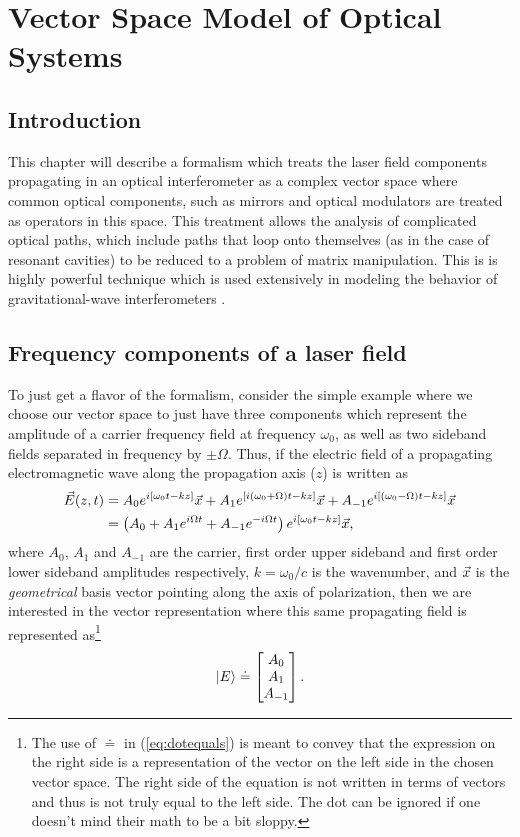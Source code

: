 

\chapter{Vector Space Model of Optical Systems}

\section{Introduction}
This chapter will describe a formalism which treats the laser field components propagating in an optical interferometer as a complex vector space where common optical components, such as mirrors and optical modulators are treated as operators in this space. %
This treatment allows the analysis of complicated optical paths, which include paths that loop onto themselves (as in the case of resonant cavities) to be reduced to a problem of matrix manipulation. %
This is is highly powerful technique which is used extensively in modeling the behavior of gravitational-wave interferometers \cite{Vinet1986,Hefetz:97,Sigg:00}.

\section{Frequency components of a laser field}
To just get a flavor of the formalism, consider the simple example where we choose our vector space to just have three components which represent the amplitude of a carrier frequency field at frequency $\omega_0$, as well as two sideband fields separated in frequency by $\pm\Omega$. %
Thus, if the electric field of a propagating electromagnetic wave along the propagation axis ($z$) is written as
\begin{align*}
\vec{E}(z,t) &= A_0 e^{i[\omega_0t -kz]}\vec{x} + A_1e^{[i(\omega_0+\Omega)t -kz]}\vec{x} + A_{-1}e^{i[(\omega_0-\Omega)t -kz]}\vec{x}\\
&= \left( A_0 + A_1 e^{i\Omega t}+A_{-1}e^{-i\Omega t}\right) e^{i[\omega_0 t-kz]}\vec{x},
\end{align*}
where $A_0$, $A_1$ and $A_{-1}$ are the carrier, first order upper sideband and first order lower sideband amplitudes respectively, $k=\omega_0/c$ is the wavenumber, and $\vec{x}$ is the \emph{geometrical} basis vector pointing along the axis of polarization, then we are interested in the vector representation where this same propagating field is represented as\footnote{The use of $\doteq$ in (\ref{eq:dotequals}) is meant to convey that the expression on the right side is a representation of the vector on the left side in the chosen vector space. %
The right side of the equation is not written in terms of vectors and thus is not truly equal to the left side. %
The dot can be ignored if one doesn't mind their math to be a bit sloppy.} 
\begin{equation}
\label{eq:dotequals}
\left| E \right> \doteq \left[\begin{matrix} A_0 \\ A_1 \\ A_{-1} \end{matrix}\right].
\end{equation}

